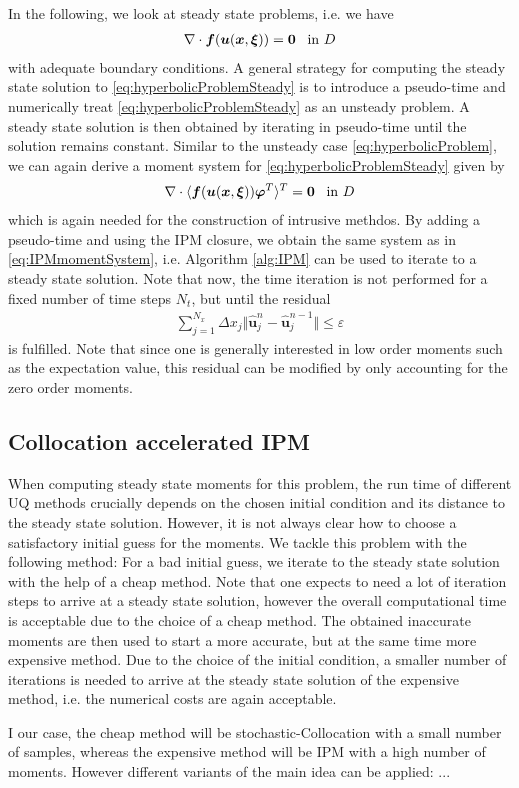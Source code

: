 In the following, we look at steady state problems, i.e. we have
\begin{align}\label{eq:hyperbolicProblemSteady}
\nabla\cdot\bm{f}(\bm{u}(\bm{x},\bm{\xi})) = \bm{0} \enskip \text{ in } D
\end{align}
with adequate boundary conditions. A general strategy for computing the steady state solution to \eqref{eq:hyperbolicProblemSteady} is to introduce a pseudo-time and numerically treat \eqref{eq:hyperbolicProblemSteady} as an unsteady problem. A steady state solution is then obtained by iterating in pseudo-time until the solution remains constant.
Similar to the unsteady case \eqref{eq:hyperbolicProblem}, we can again derive a moment system for \eqref{eq:hyperbolicProblemSteady} given by
\begin{align}\label{eq:MomentSystemSteady}
\nabla\cdot\langle\bm{f}(\bm{u}(\bm{x},\bm{\xi}))\bm{\varphi}^T\rangle^T = \bm{0} \enskip \text{ in } D
\end{align}
which is again needed for the construction of intrusive methdos. By adding a pseudo-time and using the IPM closure, we obtain the same system as in \eqref{eq:IPMmomentSystem}, i.e. Algorithm \ref{alg:IPM} can be used to iterate to a steady state solution. Note that now, the time iteration is not performed for a fixed number of time steps $N_t$, but until the residual
\begin{align*}
\sum_{j = 1}^{N_x} \Delta x_j \Vert \bm{\hat{u}}_j^n - \bm{\hat{u}}_j^{n-1} \Vert \leq \varepsilon
\end{align*}
is fulfilled. Note that since one is generally interested in low order moments such as the expectation value, this residual can be modified by only accounting for the zero order moments.

\subsection{Collocation accelerated IPM}
\label{sec:collIPM}

When computing steady state moments for this problem, the run time of different UQ methods crucially depends on the chosen initial condition and its distance to the steady state solution. However, it is not always clear how to choose a satisfactory initial guess for the moments. We tackle this problem with the following method: For a bad initial guess, we iterate to the steady state solution with the help of a cheap method. Note that one expects to need a lot of iteration steps to arrive at a steady state solution, however the overall computational time is acceptable due to the choice of a cheap method. The obtained inaccurate moments are then used to start a more accurate, but at the same time more expensive method. Due to the choice of the initial condition, a smaller number of iterations is needed to arrive at the steady state solution of the expensive method, i.e. the numerical costs are again acceptable.

I our case, the cheap method will be stochastic-Collocation with a small number of samples, whereas the expensive method will be IPM with a high number of moments. However different variants of the main idea can be applied: ...